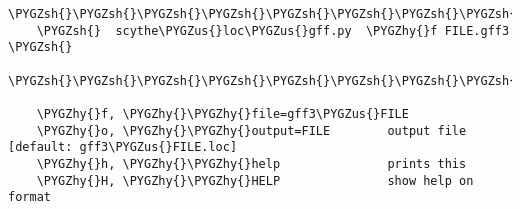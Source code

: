 \documentclass[letterpaper,10pt,english]{sphinxmanual}
\def\PYGZus{\char`\_}
\def\PYGZsh{\char`\#}
\def\PYGZhy{\char`\-}
\begin{document}
\begin{Verbatim}[commandchars=\\\{\}]
    

    \PYGZsh{}\PYGZsh{}\PYGZsh{}\PYGZsh{}\PYGZsh{}\PYGZsh{}\PYGZsh{}\PYGZsh{}\PYGZsh{}\PYGZsh{}\PYGZsh{}\PYGZsh{}\PYGZsh{}\PYGZsh{}\PYGZsh{}\PYGZsh{}\PYGZsh{}\PYGZsh{}\PYGZsh{}\PYGZsh{}\PYGZsh{}\PYGZsh{}\PYGZsh{}\PYGZsh{}\PYGZsh{}\PYGZsh{}\PYGZsh{}\PYGZsh{}\PYGZsh{}\PYGZsh{}\PYGZsh{}\PYGZsh{}\PYGZsh{}\PYGZsh{}\PYGZsh{}\PYGZsh{}\PYGZsh{}
    \PYGZsh{}  scythe\PYGZus{}loc\PYGZus{}gff.py  \PYGZhy{}f FILE.gff3  \PYGZsh{}
    \PYGZsh{}\PYGZsh{}\PYGZsh{}\PYGZsh{}\PYGZsh{}\PYGZsh{}\PYGZsh{}\PYGZsh{}\PYGZsh{}\PYGZsh{}\PYGZsh{}\PYGZsh{}\PYGZsh{}\PYGZsh{}\PYGZsh{}\PYGZsh{}\PYGZsh{}\PYGZsh{}\PYGZsh{}\PYGZsh{}\PYGZsh{}\PYGZsh{}\PYGZsh{}\PYGZsh{}\PYGZsh{}\PYGZsh{}\PYGZsh{}\PYGZsh{}\PYGZsh{}\PYGZsh{}\PYGZsh{}\PYGZsh{}\PYGZsh{}\PYGZsh{}\PYGZsh{}\PYGZsh{}\PYGZsh{}

    \PYGZhy{}f, \PYGZhy{}\PYGZhy{}file=gff3\PYGZus{}FILE
    \PYGZhy{}o, \PYGZhy{}\PYGZhy{}output=FILE        output file [default: gff3\PYGZus{}FILE.loc]
    \PYGZhy{}h, \PYGZhy{}\PYGZhy{}help               prints this
    \PYGZhy{}H, \PYGZhy{}\PYGZhy{}HELP               show help on format
\end{Verbatim}
\end{document}
